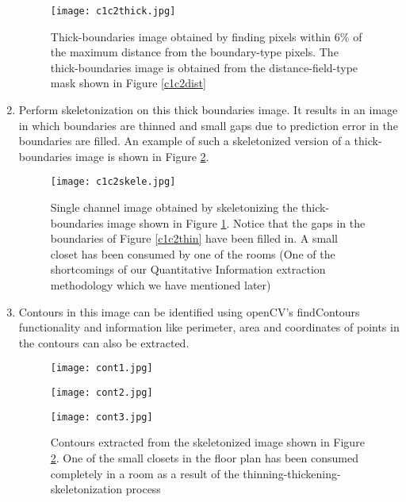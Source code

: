 \documentclass[a4paper]{article}
\begin{document}
\begin{enumerate}
    \begin{figure}[H]
    \centering
    \texttt{[image: c1c2thick.jpg]}
    \caption{Thick-boundaries image obtained by finding pixels within 6\% of the maximum distance from the boundary-type pixels. The thick-boundaries image is obtained from the distance-field-type mask shown in Figure \ref{c1c2dist}}
    \label{c1c2thick}
    \end{figure}
    \item Perform skeletonization on this thick boundaries image. It results in an image in which boundaries are thinned and small gaps due to prediction error in the boundaries are filled. An example of such a skeletonized version of a thick-boundaries image is shown in Figure \ref{c1c2skele}.
    \begin{figure}[H]
    \centering
    \texttt{[image: c1c2skele.jpg]}
    \caption{Single channel image obtained by skeletonizing the thick-boundaries image shown in Figure \ref{c1c2thick}. Notice that the gaps in the boundaries of Figure \ref{c1c2thin} have been filled in. A small closet has been consumed by one of the rooms (One of the shortcomings of our Quantitative Information extraction methodology which we have mentioned later)}
    \label{c1c2skele}
    \end{figure}
    \item Contours in this image can be identified using openCV's findContours functionality and information like perimeter, area and coordinates of points in the contours can also be extracted.
    \begin{figure}[H]
    \centering
    \texttt{[image: cont1.jpg]}
    \end{figure}
    \begin{figure}[H]
    \centering
    \texttt{[image: cont2.jpg]}
    \end{figure}
    \begin{figure}[H]
    \centering
    \texttt{[image: cont3.jpg]}
    \caption{Contours extracted from the skeletonized image shown in Figure \ref{c1c2skele}. One of the small closets in the floor plan has been consumed completely in a room as a result of the thinning-thickening-skeletonization process}
    \end{figure}
\end{enumerate}
\end{document}
